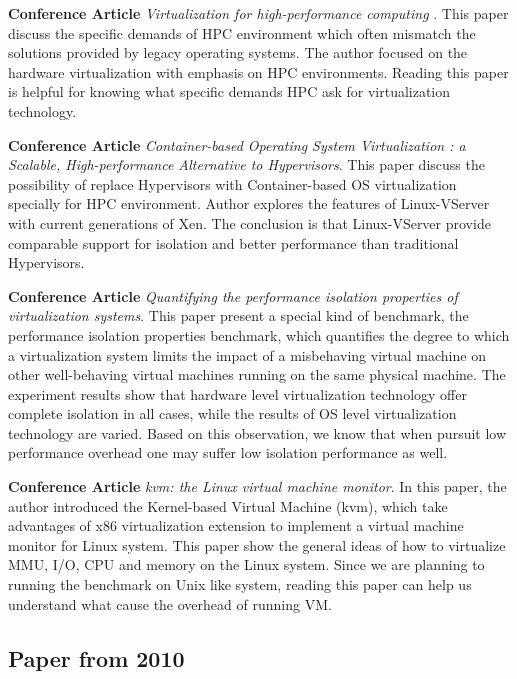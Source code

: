 \documentclass{article}
\begin{document}
\medskip

\textbf{Conference Article} \emph{Virtualization for high-performance computing}
\cite{mergen2006virtualization}. This paper discuss the specific demands of HPC environment which 
often mismatch the solutions provided by legacy operating systems. The author focused on the 
hardware virtualization with emphasis on HPC environments. Reading this paper is helpful for 
knowing what specific demands HPC ask for virtualization technology.

\medskip

\textbf{Conference Article} \emph{Container-based Operating System Virtualization
: a Scalable, High-performance Alternative to Hypervisors}\cite{soltesz2007container}. This paper 
discuss the possibility of replace Hypervisors with Container-based OS virtualization specially 
for HPC environment. Author explores the features of Linux-VServer with current generations of Xen. 
The conclusion is that Linux-VServer provide comparable support for isolation and better performance
than traditional Hypervisors.

\medskip

\textbf{Conference Article} \emph{Quantifying the performance isolation properties of virtualization 
systems}\cite{matthews2007quantifying}. This paper present a special kind of benchmark, the 
performance isolation properties benchmark, which quantifies the degree to which a virtualization
system limits the impact of a misbehaving virtual machine on other well-behaving virtual machines
running on the same physical machine. The experiment results show that hardware level virtualization
technology offer complete isolation in all cases, while the results of OS level virtualization 
technology are varied. Based on this observation, we know that when pursuit low performance overhead 
one may suffer low isolation performance as well. 

\medskip

\textbf{Conference Article} \emph{kvm: the Linux virtual machine monitor}\cite{kivity2007kvm}. 
In this paper, the author introduced the Kernel-based Virtual Machine (kvm), which take advantages of
x86 virtualization extension to implement a virtual machine monitor for Linux system. This 
paper show the general ideas of how to virtualize MMU, I/O, CPU and memory on the Linux system.
Since we are planning to running the benchmark on Unix like system, reading this paper can help us 
understand what cause the overhead of running VM.

\subsection{Paper from 2010}
\end{document}
